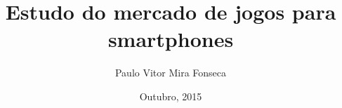 \title{Estudo do mercado de jogos para smartphones}

\author{Paulo Vitor Mira Fonseca}

\address{São José dos Campos -- SP}
\date{Outubro, 2015}

\def\tocetcmark#1{\markboth{#1}{#1}}

